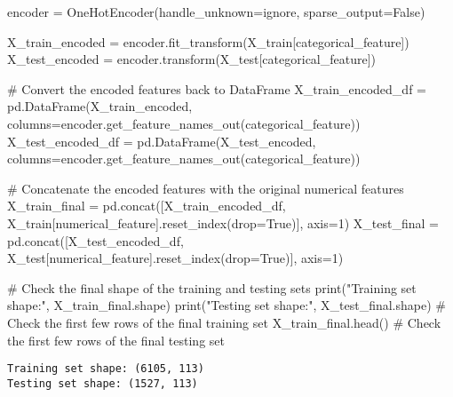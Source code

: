 \documentclass[
  letterpaper,
  DIV=11,
  numbers=noendperiod]{scrreprt}
\newenvironment{Shaded}{\begin{snugshade}}{\end{snugshade}}
\newcommand{\BuiltInTok}[1]{\textcolor[rgb]{0.00,0.23,0.31}{#1}}
\newcommand{\CommentTok}[1]{\textcolor[rgb]{0.37,0.37,0.37}{#1}}
\newcommand{\DecValTok}[1]{\textcolor[rgb]{0.68,0.00,0.00}{#1}}
\newcommand{\NormalTok}[1]{\textcolor[rgb]{0.00,0.23,0.31}{#1}}
\newcommand{\OperatorTok}[1]{\textcolor[rgb]{0.37,0.37,0.37}{#1}}
\newcommand{\StringTok}[1]{\textcolor[rgb]{0.13,0.47,0.30}{#1}}
\newcommand{\VariableTok}[1]{\textcolor[rgb]{0.07,0.07,0.07}{#1}}
\begin{document}
\begin{Shaded}
\begin{Highlighting}[]
\NormalTok{encoder }\OperatorTok{=}\NormalTok{ OneHotEncoder(handle\_unknown}\OperatorTok{=}\StringTok{\textquotesingle{}ignore\textquotesingle{}}\NormalTok{, sparse\_output}\OperatorTok{=}\VariableTok{False}\NormalTok{)}

\NormalTok{X\_train\_encoded }\OperatorTok{=}\NormalTok{ encoder.fit\_transform(X\_train[categorical\_feature])}
\NormalTok{X\_test\_encoded }\OperatorTok{=}\NormalTok{ encoder.transform(X\_test[categorical\_feature])}

\CommentTok{\# Convert the encoded features back to DataFrame}
\NormalTok{X\_train\_encoded\_df }\OperatorTok{=}\NormalTok{ pd.DataFrame(X\_train\_encoded, columns}\OperatorTok{=}\NormalTok{encoder.get\_feature\_names\_out(categorical\_feature))}
\NormalTok{X\_test\_encoded\_df }\OperatorTok{=}\NormalTok{ pd.DataFrame(X\_test\_encoded, columns}\OperatorTok{=}\NormalTok{encoder.get\_feature\_names\_out(categorical\_feature))}

\CommentTok{\# Concatenate the encoded features with the original numerical features}
\NormalTok{X\_train\_final }\OperatorTok{=}\NormalTok{ pd.concat([X\_train\_encoded\_df, X\_train[numerical\_feature].reset\_index(drop}\OperatorTok{=}\VariableTok{True}\NormalTok{)], axis}\OperatorTok{=}\DecValTok{1}\NormalTok{)}
\NormalTok{X\_test\_final }\OperatorTok{=}\NormalTok{ pd.concat([X\_test\_encoded\_df, X\_test[numerical\_feature].reset\_index(drop}\OperatorTok{=}\VariableTok{True}\NormalTok{)], axis}\OperatorTok{=}\DecValTok{1}\NormalTok{)}

\CommentTok{\# Check the final shape of the training and testing sets}
\BuiltInTok{print}\NormalTok{(}\StringTok{"Training set shape:"}\NormalTok{, X\_train\_final.shape)}
\BuiltInTok{print}\NormalTok{(}\StringTok{"Testing set shape:"}\NormalTok{, X\_test\_final.shape)}
\CommentTok{\# Check the first few rows of the final training set}
\NormalTok{X\_train\_final.head()}
\CommentTok{\# Check the first few rows of the final testing set}
\end{Highlighting}
\end{Shaded}

\begin{verbatim}
Training set shape: (6105, 113)
Testing set shape: (1527, 113)
\end{verbatim}
\end{document}
